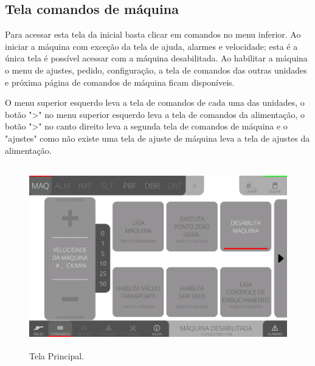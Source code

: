 \thispagestyle{fancy}

\vspace*{\fill}

\subsection{Tela comandos de máquina}

Para acessar esta tela da inicial basta clicar em comandos no menu inferior. Ao iniciar a máquina com exceção da tela de ajuda, alarmes e velocidade; esta é a única tela é possível acessar com a máquina desabilitada. Ao habilitar a máquina o menu de ajustes, pedido, configuração, a tela de comandos das outras unidades e próxima página de comandos de máquina ficam disponíveis.

O menu superior esquerdo leva a tela de comandos de cada uma das unidades, o botão "\textgreater" no menu superior esquerdo leva a tela de comandos da alimentação, o botão "\textgreater" no canto direito leva a segunda tela de comandos de máquina e o "ajustes" como não existe uma tela de ajuste de máquina leva a tela de ajustes da alimentação.

\vspace*{10pt}

\begin{figure}[h]
  \centering
  \includegraphics[width=480px,height=300px]{src/imagesFlexo/02-machine/e-Tela-Principal.png}
  \caption{Tela Principal.}
   \label{}
\end{figure}

\vspace*{\fill}

\newpage
\thispagestyle{fancy}

\vspace*{\fill}

